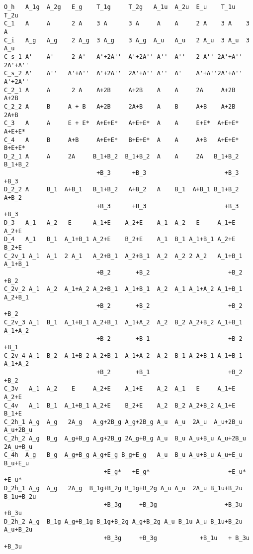 \documentclass[12pt,a4paper]{article}
\begin{document}
\begin{footnotesize}
\begin{verbatim}
O_h   A_1g  A_2g   E_g    T_1g     T_2g   A_1u  A_2u  E_u    T_1u   T_2u
C_1   A     A      2 A    3 A      3 A     A    A     2 A    3 A    3 A
C_i   A_g   A_g    2 A_g  3 A_g    3 A_g  A_u   A_u   2 A_u  3 A_u  3 A_u
C_s_1 A'    A'     2 A'   A'+2A''  A'+2A'' A''  A''   2 A'' 2A'+A'' 2A'+A''
C_s_2 A'    A''   A'+A''  A'+2A''  2A'+A'' A''  A'    A'+A''2A'+A'' A'+2A''
C_2_1 A     A      2 A    A+2B     A+2B    A    A     2A     A+2B   A+2B   
C_2_2 A     B     A + B   A+2B     2A+B    A    B     A+B    A+2B   2A+B
C_3   A     A     E + E*  A+E+E*   A+E+E*  A    A     E+E*  A+E+E*  A+E+E*
C_4   A     B     A+B     A+E+E*   B+E+E*  A    A     A+B   A+E+E*  B+E+E*
D_2_1 A     A     2A     B_1+B_2  B_1+B_2  A    A     2A   B_1+B_2  B_1+B_2
                          +B_3      +B_3                      +B_3     +B_3
D_2_2 A     B_1  A+B_1   B_1+B_2   A+B_2   A    B_1  A+B_1 B_1+B_2  A+B_2
                          +B_3      +B_3                      +B_3   +B_3
D_3   A_1   A_2   E      A_1+E    A_2+E    A_1  A_2   E     A_1+E   A_2+E
D_4   A_1   B_1  A_1+B_1 A_2+E    B_2+E    A_1  B_1 A_1+B_1 A_2+E   B_2+E
C_2v_1 A_1  A_1  2 A_1   A_2+B_1  A_2+B_1  A_2  A_2 2 A_2   A_1+B_1 A_1+B_1
                          +B_2       +B_2                      +B_2    +B_2
C_2v_2 A_1  A_2  A_1+A_2 A_2+B_1  A_1+B_1  A_2  A_1 A_1+A_2 A_1+B_1 A_2+B_1
                          +B_2       +B_2                      +B_2    +B_2
C_2v_3 A_1  B_1  A_1+B_1 A_2+B_1  A_1+A_2  A_2  B_2 A_2+B_2 A_1+B_1 A_1+A_2
                          +B_2       +B_1                      +B_2    +B_1
C_2v_4 A_1  B_2  A_1+B_2 A_2+B_1  A_1+A_2  A_2  B_1 A_2+B_1 A_1+B_1 A_1+A_2
                          +B_2       +B_1                      +B_2    +B_2
C_3v   A_1  A_2    E     A_2+E    A_1+E    A_2  A_1   E     A_1+E   A_2+E
C_4v   A_1  B_1  A_1+B_1 A_2+E    B_2+E    A_2  B_2 A_2+B_2 A_1+E   B_1+E
C_2h_1 A_g  A_g   2A_g   A_g+2B_g A_g+2B_g A_u  A_u  2A_u  A_u+2B_u A_u+2B_u
C_2h_2 A_g  B_g  A_g+B_g A_g+2B_g 2A_g+B_g A_u  B_u A_u+B_u A_u+2B_u 2A_u+B_u
C_4h  A_g   B_g  A_g+B_g A_g+E_g B_g+E_g   A_u  B_u A_u+B_u A_u+E_u B_u+E_u
                            +E_g*   +E_g*                      +E_u*   +E_u*
D_2h_1 A_g  A_g   2A_g  B_1g+B_2g B_1g+B_2g A_u A_u  2A_u B_1u+B_2u B_1u+B_2u
                            +B_3g     +B_3g                   +B_3u     +B_3u
D_2h_2 A_g  B_1g A_g+B_1g B_1g+B_2g A_g+B_2g A_u B_1u A_u B_1u+B_2u A_u+B_2u
                            +B_3g     +B_3g            +B_1u   + B_3u  +B_3u

\end{verbatim}
\end{footnotesize}
\end{document}
